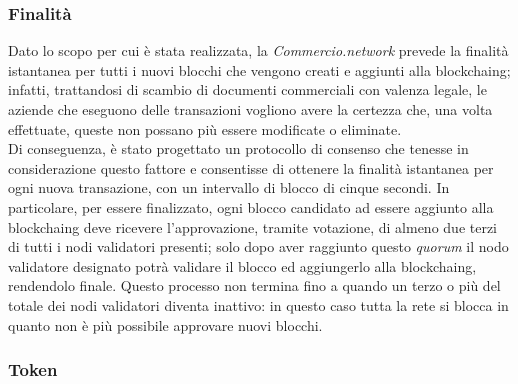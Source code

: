 \subsubsection*{Finalità}

Dato lo scopo per cui è stata realizzata, la \textit{Commercio.network} prevede la finalità istantanea per tutti i nuovi blocchi che vengono creati e aggiunti alla \gls{blockchaing}; infatti, trattandosi di scambio di documenti commerciali con valenza legale, le aziende che eseguono delle transazioni vogliono avere la certezza che, una volta effettuate, queste non possano più essere modificate o eliminate.\\
Di conseguenza, è stato progettato un protocollo di consenso che tenesse in considerazione questo fattore e consentisse di ottenere la finalità istantanea per ogni nuova transazione, con un intervallo di blocco di cinque secondi. In particolare, per essere finalizzato, ogni blocco candidato ad essere aggiunto alla \gls{blockchaing} deve ricevere l'approvazione, tramite votazione, di almeno due terzi di tutti i nodi validatori presenti; solo dopo aver raggiunto questo \textit{quorum} il nodo validatore designato potrà validare il blocco ed aggiungerlo alla \gls{blockchaing}, rendendolo finale. Questo processo non termina fino a quando un terzo o più del totale dei nodi validatori diventa inattivo: in questo caso tutta la rete si blocca in quanto non è più possibile approvare nuovi blocchi. 

\subsubsection*{Token}

